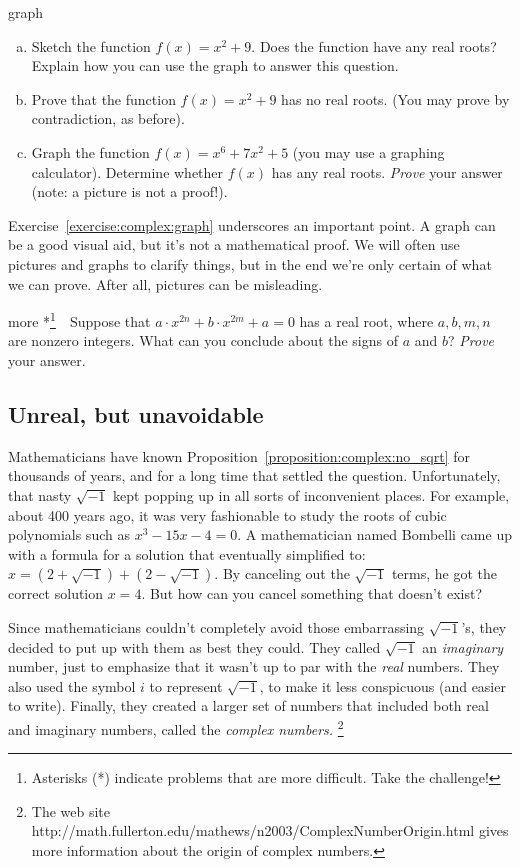 \begin{exercise}{graph}
\begin{enumerate}[(a)]
\item
Sketch the function  $f(x) = x^2 + 9$. Does the function have any real roots? Explain how you can use the graph to answer this question.
\item 
Prove that the function $f(x) = x^2 + 9$ has no real roots.  (You may prove by contradiction, as before). 
\item
Graph the function $f(x) = x^6 + 7x^2 + 5$ (you may use a graphing calculator). Determine whether $f(x)$ has any real roots. \emph{Prove} your answer (note: a picture is not a proof!).
\end{enumerate}
\end{exercise}
\noindent
Exercise~\ref{exercise:complex:graph} underscores an important point. A graph can be a good visual aid, but it's not a mathematical proof.  We will often use pictures and graphs to clarify things, but in the end we're only certain of what we can prove. After all, pictures can be misleading.

\begin{exercise}{more}
*\footnote{Asterisks (*) indicate problems that are more difficult. Take the challenge!}~~Suppose that $a \cdot x^{2n} + b \cdot x^{2m} +a = 0$ has a real root, where $a,b,m,n$ are nonzero integers. What can you conclude about the signs of $a$ and $b$? \emph{Prove} your answer.
\end{exercise}

\subsection{Unreal, but unavoidable}

Mathematicians have known Proposition~\ref{proposition:complex:no_sqrt} for thousands of years, and
for a long time that settled the question. Unfortunately, that nasty
$\sqrt{-1}$ kept popping up in all sorts of inconvenient places.
For example, about 400 years ago, it was very fashionable to study
the roots of cubic polynomials such as $x^{3}-15x-4=0$. A mathematician
named Bombelli came up with a formula for a solution that eventually
simplified to: $x = (2 + \sqrt{-1}) + (2 - \sqrt{-1})$. By canceling
out the $\sqrt{-1}$ terms, he got the correct solution $x=4$.
But how can you cancel something that doesn't exist?

Since mathematicians couldn't completely avoid those embarrassing 
$\sqrt{-1}$'s, they decided to put up with them as best they could. They
called $\sqrt{-1}$ an \emph{imaginary }number, just to emphasize
that it wasn't up to par with the \emph{real} numbers. They also used the symbol $i$ to represent $\sqrt{-1}$, to make it less
conspicuous (and easier to write). Finally, they created a larger
set of numbers that included both real and imaginary numbers, called
the \emph{complex numbers.}
\footnote{The web site http://math.fullerton.edu/mathews/n2003/ComplexNumberOrigin.html
gives more information about the origin of complex numbers.}

